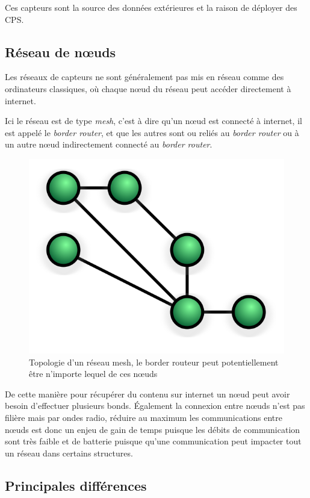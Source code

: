 Ces capteurs sont la source des données extérieures et la raison de déployer des CPS.

\subsection{Réseau de nœuds}

Les réseaux de capteurs ne sont généralement pas mis en réseau comme des ordinateurs classiques, où chaque nœud du réseau peut accéder directement à internet.

Ici le réseau est de type \emph{mesh}, c'est à dire qu'un nœud est connecté à internet, il est appelé le \emph{border router}, et que les autres sont ou reliés au \emph{border router} ou à un autre nœud indirectement connecté au \emph{border router}.

\begin{figure}[ht!]
\centering
\includegraphics[scale=0.3]{images/mesh-network.png}
\caption{Topologie d'un réseau mesh, le border routeur peut potentiellement être n'importe lequel de ces nœuds}
\end{figure}

De cette manière pour récupérer du contenu sur internet un nœud peut avoir besoin d'effectuer plusieurs bonds. Également la connexion entre nœuds n'est pas filière mais par ondes radio, réduire au maximum les communications entre nœuds est donc un enjeu de gain de temps puisque les débits de communication sont très faible et de batterie puisque qu'une communication peut impacter tout un réseau dans certains structures.

\subsection{Principales différences}

